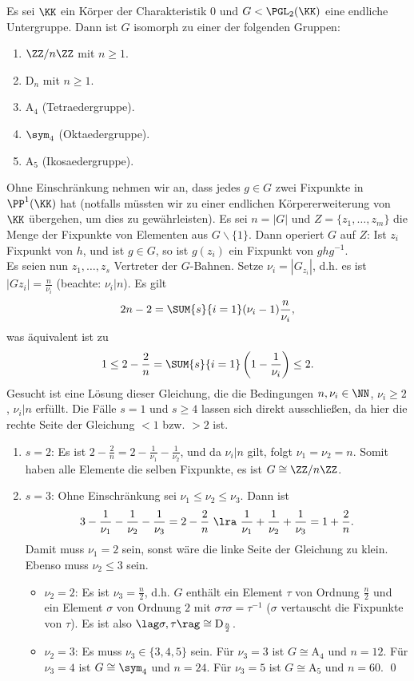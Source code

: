 \SATZ Es sei $\KK$ ein Körper der Charakteristik $0$ und
$G<\PGL_2(\KK)$ eine endliche Untergruppe.
Dann ist $G$ isomorph zu einer der folgenden Gruppen:
\begin{enumerate}
\item $\ZZ/n\ZZ$ mit $n\geq 1$.
\item $\mathrm{D}_n$ mit $n\geq 1$.
\item $\mathrm{A}_4$ (Tetraedergruppe).
\item $\sym_4$ (Oktaedergruppe).
\item $\mathrm{A}_5$ (Ikosaedergruppe).
\end{enumerate}
\bew Ohne Einschränkung nehmen wir an, dass jedes $g\in G$ zwei
Fixpunkte in $\PP^1(\KK)$ hat (notfalls müssten wir zu einer
endlichen Körpererweiterung von $\KK$ übergehen, um dies zu
gewährleisten). Es sei $n=|G|$ und $Z=\{z_1,\ldots,z_m\}$
die Menge der Fixpunkte von Elementen aus $G\backslash\{1\}$.
Dann operiert $G$ auf $Z$: Ist $z_i$ Fixpunkt von $h$, und ist
$g\in G$, so ist $g(z_i)$ ein Fixpunkt von $ghg^{-1}$.\\
Es seien nun $z_1,\ldots,z_s$ Vertreter der $G$-Bahnen.
Setze $\nu_i=|G_{z_i}|$, d.h. es ist $|G z_i|=\frac{n}{\nu_i}$
(beachte: $\nu_i|n$). Es gilt
\[
2n-2 = \SUM{s}{i=1}(\nu_i-1)\frac{n}{\nu_i},
\]
was äquivalent ist zu
\[
1\leq 2-\frac{2}{n} = \SUM{s}{i=1}\left(1-\frac{1}{\nu_i}\right)
\leq 2.
\]
Gesucht ist eine Lösung dieser Gleichung, die die Bedingungen
$n,\nu_i\in\NN$, $\nu_i\geq 2$, $\nu_i|n$ erfüllt.
Die Fälle $s=1$ und $s\geq 4$ lassen sich direkt ausschließen,
da hier die rechte Seite der Gleichung $<1$ bzw. $>2$ ist.
\begin{enumerate}
\item[]$s=2$: Es ist
$2-\frac{2}{n}=2-\frac{1}{\nu_1}-\frac{1}{\nu_2}$, und da $\nu_i|n$
gilt, folgt $\nu_1=\nu_2=n$. Somit haben alle Elemente die selben
Fixpunkte, es ist $G\cong\ZZ/n\ZZ$.
\item[]$s=3$: Ohne Einschränkung sei $\nu_1\leq\nu_2\leq\nu_3$.
Dann ist
\[
3-\frac{1}{\nu_1}-\frac{1}{\nu_2}-\frac{1}{\nu_3}=2-\frac{2}{n}
\ \lra\ 
\frac{1}{\nu_1}+\frac{1}{\nu_2}+\frac{1}{\nu_3}=1+\frac{2}{n}.
\]
Damit muss $\nu_1=2$ sein, sonst wäre die linke Seite der Gleichung
zu klein. Ebenso muss $\nu_2\leq 3$ sein.
\begin{itemize}
\item[]$\nu_2=2$: Es ist $\nu_3=\frac{n}{2}$, d.h. $G$ enthält
ein Element $\tau$ von Ordnung $\frac{n}{2}$ und ein Element
$\sigma$ von Ordnung $2$ mit $\sigma\tau\sigma=\tau^{-1}$
($\sigma$ vertauscht die Fixpunkte von $\tau$).
Es ist also $\lag\sigma,\tau\rag\cong\mathrm{D}_{\frac{n}{2}}$.
\item[] $\nu_2=3$: Es muss $\nu_3\in\{3,4,5\}$ sein.
Für $\nu_3=3$ ist $G\cong\mathrm{A}_4$ und $n=12$.
Für $\nu_3=4$ ist $G\cong\sym_4$ und $n=24$.
Für $\nu_3=5$ ist $G\cong\mathrm{A}_5$ und $n=60$.
\qed
\end{itemize}
\end{enumerate}


